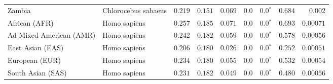\begin{center}
\begin{adjustbox}{width = 1\textwidth}
\begin{tabular}{|l|l|r|r|r|r|r|r|r|}
            Zambia        & Chlorocebus sabaeus        & $ 0.219$ & $ 0.151$ & $ 0.069$ & $0.0$ & $\bm{0.0{^*}}$ & $ 0.684$ & $ 0.002$ \\
            African (AFR)               & Homo sapiens        & $ 0.257$ & $ 0.185$ & $ 0.071$ & $0.0$ & $\bm{0.0{^*}}$ & $ 0.693$ & $0.00071$ \\
            Ad Mixed American (AMR)                 & Homo sapiens        & $ 0.242$ & $ 0.182$ & $ 0.059$ & $0.0$ & $\bm{0.0{^*}}$ & $ 0.578$ & $0.00056$ \\
            East Asian (EAS)              & Homo sapiens        & $ 0.206$ & $ 0.180$ & $ 0.026$ & $0.0$ & $\bm{0.0{^*}}$ & $ 0.252$ & $0.00051$ \\
            European (EUR)              & Homo sapiens        & $ 0.234$ & $ 0.180$ & $ 0.055$ & $0.0$ & $\bm{0.0{^*}}$ & $ 0.532$ & $0.00054$ \\
            South Asian (SAS)              & Homo sapiens        & $ 0.231$ & $ 0.182$ & $ 0.049$ & $0.0$ & $\bm{0.0{^*}}$ & $ 0.480$ & $0.00056$ \\
            \bottomrule
        \end{tabular}
    \end{adjustbox}
    \newpage
\end{center}

